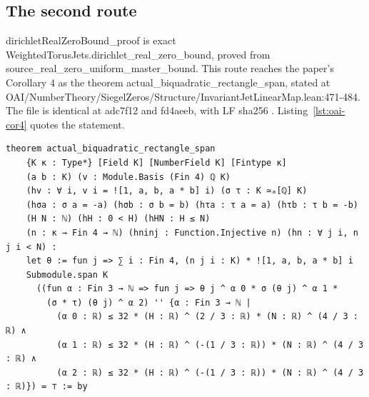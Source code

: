 \subsection{The second route}

dirichletRealZeroBound\_proof is exact WeightedTorusJets.dirichlet\_real\_zero\_bound, proved from source\_real\_zero\_uniform\_master\_bound. %
This route reaches the paper's Corollary 4 as the theorem actual\_biquadratic\_rectangle\_span, stated at OAI/NumberTheory/SiegelZeros/Structure/InvariantJetLinearMap.lean:471-484. %
The file is identical at adc7f12 and fd4aeeb, with LF sha256 . %
Listing~\ref{lst:oai-cor4} quotes the statement. %

\begin{listing}[tbp]
\caption{OAI's Corollary 4, OAI/\allowbreak NumberTheory/\allowbreak SiegelZeros/\allowbreak Structure/\allowbreak InvariantJetLinearMap.lean:471-484 (LF sha256 09b8bd7f\ldots, identical at adc7f12 and fd4aeeb).}\label{lst:oai-cor4} %
\begin{Verbatim}
theorem actual_biquadratic_rectangle_span
    {K κ : Type*} [Field K] [NumberField K] [Fintype κ]
    (a b : K) (v : Module.Basis (Fin 4) ℚ K)
    (hv : ∀ i, v i = ![1, a, b, a * b] i) (σ τ : K ≃ₐ[ℚ] K)
    (hσa : σ a = -a) (hσb : σ b = b) (hτa : τ a = a) (hτb : τ b = -b)
    (H N : ℕ) (hH : 0 < H) (hHN : H ≤ N)
    (n : κ → Fin 4 → ℕ) (hninj : Function.Injective n) (hn : ∀ j i, n j i < N) :
    let θ := fun j => ∑ i : Fin 4, (n j i : K) * ![1, a, b, a * b] i
    Submodule.span K
      ((fun α : Fin 3 → ℕ => fun j => θ j ^ α 0 * σ (θ j) ^ α 1 *
        (σ * τ) (θ j) ^ α 2) '' {α : Fin 3 → ℕ |
          (α 0 : ℝ) ≤ 32 * (H : ℝ) ^ (2 / 3 : ℝ) * (N : ℝ) ^ (4 / 3 : ℝ) ∧
          (α 1 : ℝ) ≤ 32 * (H : ℝ) ^ (-(1 / 3 : ℝ)) * (N : ℝ) ^ (4 / 3 : ℝ) ∧
          (α 2 : ℝ) ≤ 32 * (H : ℝ) ^ (-(1 / 3 : ℝ)) * (N : ℝ) ^ (4 / 3 : ℝ)}) = ⊤ := by
\end{Verbatim}
\end{listing}

